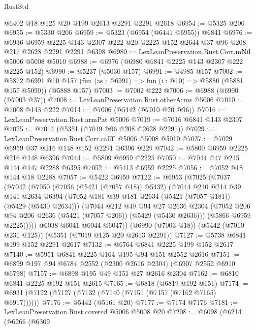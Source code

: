 \begin{lexlean}{RustStd}
\begin{coremodule}
{\begin{coremodule}
{{{{{{{{{{{{    @6402
    @18
    @125
    @20
    @199
    @2613
    @2291
    @2291
    @2618
@6954 := @5325 @206
@6955 := @5330 @206
@6959 := @5323 (@6954 (@6441 @6955)) @6841
@6976 := @6936
    @6959
    @2225
    @143
    @2307
    @222
    @20
    @2225
    @152
    @2644
    @37
    @96
    @208
    @217
    @2628
    @2291
    @2291
    @6398
@6980 := LexLeanPreservation.Rust.Corr.mNil @5006 @5008 @5010
@6988 := @6976 (@6980 @6841 @2225 @143 @2307 @222 @2225 @152)
@6990 := @5237 (@5030 @157)
@6991 := @4985 @157
@7002 := @5872
    @6991
    @10
    @157
    (fun (as : @6991) => fun (i : @10) => @5880 (@5881 @157 @5090))
    (@5888 @157)
@7003 := @7002 @222
@7006 := @6988 (@6990 (@7003 @37))
@7008 := LexLeanPreservation.Rust.otherArms @5006
@7010 := @7008 @143 @222
@7014 := @7006 (@5442 (@7010 @20 @96))
@7016 := LexLeanPreservation.Rust.armPat @5006
@7019 := @7016 @6841 @143 @2307
@7025 := @7014 (@5351 (@7019 @96 @208 @2628 @2291))
@7029 := LexLeanPreservation.Rust.Corr.callF @5006 @5008 @5010
@7037 := @7029 @6959 @37 @216 @148 @152 @2291 @6396 @229
@7042 := @5800 @6959 @2225 @216 @148 @6396
@7044 := @5809 @6959 @2225
@7050 := @7044 @47 @215 @144 @147 @2288 @6395
@7052 := @5413 @6959 @2225
@7056 := @7052 @18 @144 @18 @2288
@7057 := @5422 @6959
@7122 := @6953
    (@7025
      (@7037
        (@7042
          (@7050
            (@7056 (@5421 (@7057 @18)) @5432)
            (@7044
              @210
              @214
              @39
              @141
              @2634
              @6394
              (@7052 @181 @39 @181 @2634 (@5421 (@7057 @181)) (@5429 (@5430 @2634)))
              (@7044
                @212
                @49
                @94
                @27
                @2636
                @2304
                (@7052 @206 @94 @206 @2636 (@5421 (@7057 @206)) (@5429 (@5430 @2636)))
                (@5866 @6959 @2225)))))
        @6038
        @6041
        @6044
        @6047))
    (@6990 (@7003 @18))
    (@5442 (@7010 @231 @125))
    (@5351 (@7019 @125 @20 @2613 @2291))
@7127 := @5738 @6841 @199 @152 @2291 @2617
@7132 := @6764 @6841 @2225 @199 @152 @2617
@7140 := @5951 @6841 @2225 @164 @195 @94 @151 @2552 @2616
@7151 := @6899 @197 @94 @6784 @2552 (@2300 @2616 @2304) (@6907 @2552 @6910 @6798)
@7157 := @6898 @195 @49 @151 @27 @2616 @2304
@7162 := @6810 @6841 @2225 @192 @151 @2615
@7165 := @6818 (@6819 @192 @151)
@7174 := @6931 (@7122 (@7127 (@7132 (@7140 (@7151 (@7157 (@7162 @7165) @6917))))))
@7176 := @5442 (@5161 @20)
@7177 := @7174 @7176
@7181 := LexLeanPreservation.Rust.covered @5006 @5008 @20
@7208 := @6098
    (@6214
      (@6266
        (@6309
}}}}}}}}}}}}
\end{coremodule}}
\end{coremodule}
\end{lexlean}
